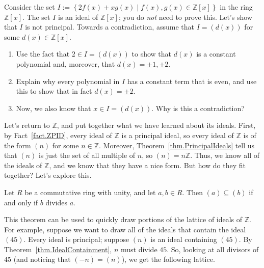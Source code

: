 \begin{problem}
Consider the set $I:= \left\{2f(x) + xg(x)\mid f(x),g(x) \in \mathbb{Z}[x]\right\}$ in the ring $\mathbb{Z}[x]$. The set $I$ is an ideal of $\mathbb{Z}[x]$; you do \emph{not} need to prove this. Let's show that $I$ is not principal. Towards a contradiction, assume that $I = (d(x))$ for some $d(x)\in \mathbb{Z}[x]$.
\begin{enumerate}
\item Use the fact that $2\in I = (d(x))$ to show that $d(x)$ is a constant polynomial and, moreover, that $d(x) = \pm 1,\pm2$. 
\item Explain why every polynomial in $I$ has a constant term that is even, and use this to show that in fact $d(x) = \pm2$.
\item Now, we also know that $x\in I = (d(x))$. Why is this a contradiction?
\end{enumerate}
\end{problem}

Let's return to $\mathbb{Z}$, and put together what we have learned about its ideals. First, by Fact~\ref{fact.ZPID}, every ideal of $\mathbb{Z}$ is a principal ideal, so every ideal of $\mathbb{Z}$ is of the form $(n)$ for some $n\in \mathbb{Z}$. Moreover, Theorem~\ref{thm.PrincipalIdeals} tell us that $(n)$ is just the set of all multiple of $n$, so $(n) = n\mathbb{Z}$. Thus, we know all of the ideals of $\mathbb{Z}$, and we know that they have a nice form. But how do they fit together? Let's explore this.

\begin{theorem}\label{thm.IdealContainment}
Let $R$ be a commutative ring with unity, and let $a,b \in R$. Then $(a) \subseteq (b)$ if and only if $b$ divides $a$.
\end{theorem}

This theorem can be used to quickly draw portions of the lattice of ideals of $\mathbb{Z}$. For example, suppose we want to draw all of the ideals that contain the ideal $(45)$. Every ideal is principal; suppose $(n)$ is an ideal containing $(45)$. By Theorem~\ref{thm.IdealContainment}, $n$ must divide $45$. So, looking at all divisors of $45$ (and noticing that $(-n) = (n)$), we get the following lattice. 
\begin{center}
\end{center}

